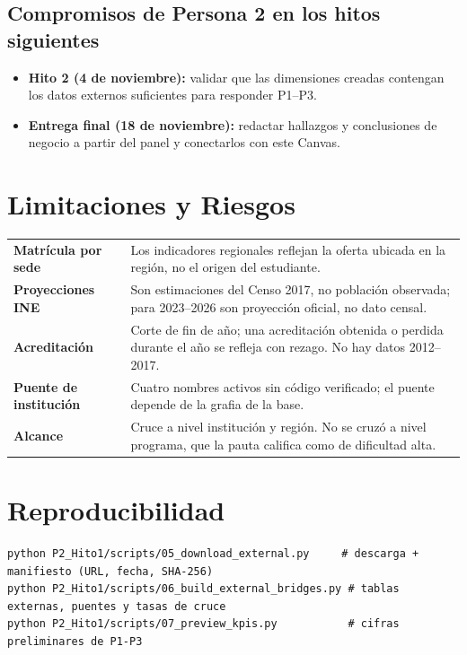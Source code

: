 \documentclass[11pt,a4paper]{article}
\begin{document}
\subsection{Compromisos de Persona 2 en los hitos siguientes}
\begin{itemize}
    \item \textbf{Hito 2 (4 de noviembre):} validar que las dimensiones creadas contengan los datos externos suficientes para responder P1--P3.
    \item \textbf{Entrega final (18 de noviembre):} redactar hallazgos y conclusiones de negocio a partir del panel y conectarlos con este Canvas.
\end{itemize}

\section{Limitaciones y Riesgos}
\begin{tabularx}{\textwidth}{@{}>{\bfseries}p{4.2cm}Y@{}}
\toprule
Matr\'icula por sede & Los indicadores regionales reflejan la oferta ubicada en la regi\'on, no el origen del estudiante. \\
Proyecciones INE & Son estimaciones del Censo 2017, no poblaci\'on observada; para 2023--2026 son proyecci\'on oficial, no dato censal. \\
Acreditaci\'on & Corte de fin de a\~no; una acreditaci\'on obtenida o perdida durante el a\~no se refleja con rezago. No hay datos 2012--2017. \\
Puente de instituci\'on & Cuatro nombres activos sin c\'odigo verificado; el puente depende de la grafia de la base. \\
Alcance & Cruce a nivel instituci\'on y regi\'on. No se cruz\'o a nivel programa, que la pauta califica como de dificultad alta. \\
\bottomrule
\end{tabularx}

\appendix
\section{Reproducibilidad}
\begin{lstlisting}
python P2_Hito1/scripts/05_download_external.py     # descarga + manifiesto (URL, fecha, SHA-256)
python P2_Hito1/scripts/06_build_external_bridges.py # tablas externas, puentes y tasas de cruce
python P2_Hito1/scripts/07_preview_kpis.py           # cifras preliminares de P1-P3
\end{lstlisting}
\end{document}
